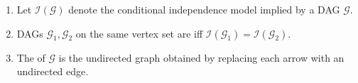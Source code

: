 \begin{definition} \label{def:markov-equivalence-dag} 
\begin{enumerate}[label=(\roman*)]
\setlength{\itemsep}{0pt}
\item Let $\mathcal{I}(\mathcal{G})$ denote the conditional independence model implied by a DAG $\mathcal{G}$.
\item DAGs $\mathcal{G}_1,\mathcal{G}_2$ on the same vertex set are  iff $\mathcal{I}(\mathcal{G}_1)=\mathcal{I}(\mathcal{G}_2)$.
\item The  of $\mathcal{G}$ is the undirected graph obtained by replacing each arrow with an undirected edge.
\end{enumerate}
\end{definition}

